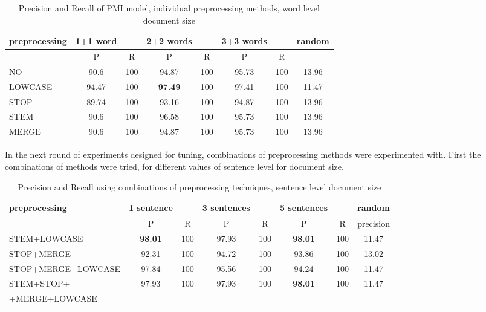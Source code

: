 \begin{table}[h!]
\begin{tabular}{ l | c c | c c | c c | c}
   preprocessing &  1+1 word && 2+2 words && 3+3 words && random\\
\hline
	& P  &  R & P  &  R & P  &  R &\\
\hline\hline
NO  & 90.6 & 100 & 94.87 & 100 & 95.73 & 100 & 13.96 \\
LOWCASE  & 94.47 & 100 & \textbf{97.49} & 100 & 97.41 & 100 & 11.47  \\
STOP  & 89.74 & 100 & 93.16 & 100 & 94.87 & 100 & 13.96 \\
STEM  & 90.6 & 100 & 96.58 & 100 & 95.73 & 100 & 13.96\\
 MERGE  & 90.6 & 100 & 94.87 & 100 & 95.73 & 100 & 13.96 \\
\end{tabular}
\caption{Precision and Recall of PMI model, individual preprocessing methods, word level document size}
\end{table}

In the next round of experiments designed for tuning, combinations of preprocessing methods were experimented 
with. First the combinations of methods were tried, for different values of sentence level for document size.

 \begin{table}[h!]
\begin{footnotesize}
\begin{tabular}{ l | c c | c c | c c | c}
   preprocessing &  1 sentence && 3 sentences && 5 sentences  && random\\
\hline
	& P  &  R & P  &  R & P  &  R & precision\\
\hline\hline
 STEM+LOWCASE  & \textbf{98.01} & 100 & 97.93 & 100 & \textbf{98.01} & 100 & 11.47\\
STOP+MERGE  & 92.31 & 100 & 94.72 & 100 & 93.86 & 100 & 13.02 \\
STOP+MERGE+LOWCASE  & 97.84 & 100 & 95.56 & 100 & 94.24 & 100 &11.47\\
STEM+STOP+& 97.93 & 100 & 97.93 & 100 & \textbf{98.01} & 100 & 11.47 \\
+MERGE+LOWCASE  &&&&&&&\\
\end{tabular}
\caption{Precision and Recall using combinations of preprocessing techniques, sentence level document size}
\end{footnotesize}
\end{table}

